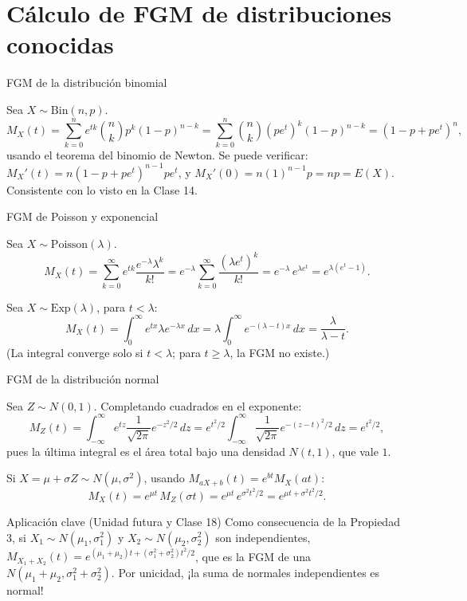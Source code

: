 \documentclass[aspectratio=169,11pt]{beamer}
\begin{document}
\section{Cálculo de FGM de distribuciones conocidas}

\begin{frame}{FGM de la distribución binomial}
\begin{example}
Sea $X \sim \text{Bin}(n,p)$.
\[
M_X(t) = \sum_{k=0}^n e^{tk} \binom{n}{k} p^k (1-p)^{n-k} = \sum_{k=0}^n \binom{n}{k} (pe^t)^k (1-p)^{n-k} = (1-p+pe^t)^n,
\]
usando el teorema del binomio de Newton. Se puede verificar: $M_X'(t) = n(1-p+pe^t)^{n-1}pe^t$, y $M_X'(0) = n(1)^{n-1}p = np = E(X)$. Consistente con lo visto en la Clase 14.
\end{example}
\end{frame}

\begin{frame}{FGM de Poisson y exponencial}
\begin{example}[Poisson]
Sea $X \sim \text{Poisson}(\lambda)$.
\[
M_X(t) = \sum_{k=0}^\infty e^{tk}\frac{e^{-\lambda}\lambda^k}{k!} = e^{-\lambda}\sum_{k=0}^\infty \frac{(\lambda e^t)^k}{k!} = e^{-\lambda}\, e^{\lambda e^t} = e^{\lambda(e^t-1)}.
\]
\end{example}

\begin{example}[Exponencial]
Sea $X \sim \text{Exp}(\lambda)$, para $t < \lambda$:
\[
M_X(t) = \int_0^\infty e^{tx}\lambda e^{-\lambda x}\, dx = \lambda \int_0^\infty e^{-(\lambda-t)x}\, dx = \frac{\lambda}{\lambda - t}.
\]
(La integral converge solo si $t<\lambda$; para $t\geq \lambda$, la FGM no existe.)
\end{example}
\end{frame}

\begin{frame}{FGM de la distribución normal}
\begin{example}
Sea $Z \sim N(0,1)$. Completando cuadrados en el exponente:
\[
M_Z(t) = \int_{-\infty}^{\infty} e^{tz}\frac{1}{\sqrt{2\pi}}e^{-z^2/2}\, dz = e^{t^2/2}\int_{-\infty}^\infty \frac{1}{\sqrt{2\pi}} e^{-(z-t)^2/2}\, dz = e^{t^2/2},
\]
pues la última integral es el área total bajo una densidad $N(t,1)$, que vale $1$.

\medskip
Si $X = \mu + \sigma Z \sim N(\mu,\sigma^2)$, usando $M_{aX+b}(t)=e^{bt}M_X(at)$:
\[
M_X(t) = e^{\mu t}\, M_Z(\sigma t) = e^{\mu t}\, e^{\sigma^2 t^2/2} = e^{\mu t + \sigma^2 t^2/2}.
\]
\end{example}

\begin{alertblock}{Aplicación clave (Unidad futura y Clase 18)}
Como consecuencia de la Propiedad 3, si $X_1 \sim N(\mu_1,\sigma_1^2)$ y $X_2\sim N(\mu_2,\sigma_2^2)$ son independientes, $M_{X_1+X_2}(t) = e^{(\mu_1+\mu_2)t + (\sigma_1^2+\sigma_2^2)t^2/2}$, que es la FGM de una $N(\mu_1+\mu_2,\sigma_1^2+\sigma_2^2)$. Por unicidad, ¡la suma de normales independientes es normal!
\end{alertblock}
\end{frame}
\end{document}

